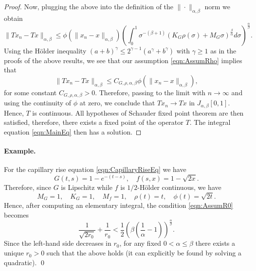 \documentclass[12pt,a4paper]{article}
\begin{document}
\begin{proof}
	Now, plugging the above into the definition of the $\|\cdot\|_{\alpha,\beta}$ norm we obtain
	\begin{equation}
		\|Tx_n - Tx\|_{\alpha,\beta} \leq \phi(\|x_n-x\|_{\alpha,\beta}) \left(\int_0^1 \sigma^{-(\beta+1)}\left(K_G\rho(\sigma) + M_G\sigma\right)^\frac{\beta}{\alpha}d\sigma \right)^\frac{\alpha}{\beta}.
	\end{equation}
	Using the H\"older inequality $(a+b)^\gamma \leq 2^{\gamma-1} (a^\gamma+b^\gamma)$ with $\gamma\geq 1$ as in the proofs of the above results, we see that our assumption \eqref{eqn:AssumRho} implies that
	\begin{equation}
		\|Tx_n - Tx\|_{\alpha,\beta} \leq C_{G,\rho,\alpha,\beta} \phi(\|x_n-x\|_{\alpha,\beta}),
	\end{equation}
	for some constant $C_{G,\rho,\alpha,\beta} > 0$. Therefore, passing to the limit with $n\rightarrow \infty$ and using the continuity of $\phi$ at zero, we conclude that $Tx_n \rightarrow Tx$ in $J_{\alpha,\beta}[0,1]$. Hence, $T$ is continuous. All hypotheses of Schauder fixed point theorem are then satisfied, therefore, there exists a fixed point of the operator $T$. The integral equation \eqref{eqn:MainEq} then has a solution.
\end{proof}

\paragraph{Example.} For the capillary rise equation \eqref{eqn:CapillaryRiseEq} we have
\begin{equation}
	G(t,s) = 1- e^{-(t-s)}, \quad f(s, x) = 1 - \sqrt{2x}.
\end{equation}
Therefore, since $G$ is Lipschitz while $f$ is $1/2$-H\"older continuous, we have
\begin{equation}
	M_G = 1, \quad K_G = 1, \quad M_f = 1, \quad \rho(t) = t, \quad \phi(t) = \sqrt{2t}. 
\end{equation}
Hence, after computing an elementary integral, the condition \eqref{eqn:AssumR0} becomes
\begin{equation}
	\frac{1}{\sqrt{2r_0}} + \frac{1}{r_0} <\frac{1}{2} \left(\beta\left(\frac{1}{\alpha}-1\right)\right)^\frac{\alpha}{\beta}. 
\end{equation}
Since the left-hand side decreases in $r_0$, for any fixed $0<\alpha\leq \beta$ there exists a unique $r_0 > 0$ such that the above holds (it can explicitly be found by solving a quadratic). \qed
\end{document}
